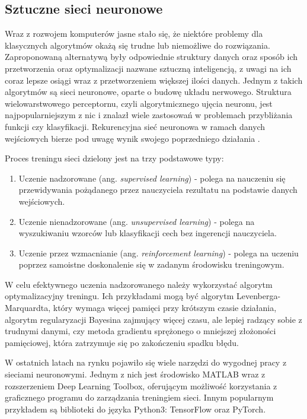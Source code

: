 \documentclass[12pt, a4paper]{article}
\begin{document}
\subsection{Sztuczne sieci neuronowe}
Wraz z rozwojem komputerów jasne stało się, że niektóre problemy dla klasycznych algorytmów okażą się trudne lub niemożliwe do rozwiązania. Zaproponowaną alternatywą były odpowiednie struktury danych oraz sposób ich przetworzenia oraz optymalizacji nazwane sztuczną inteligencją, z uwagi na ich coraz lepsze osiągi wraz z przetworzeniem większej ilości danych. Jednym z takich algorytmów są sieci neuronowe, oparte o budowę układu nerwowego. Struktura wielowarstwowego perceptornu, czyli algorytmicznego ujęcia neuronu, jest najpopularniejszym z nic i znalazł wiele zastosowań w problemach przybliżania funkcji czy klasyfikacji. Rekurencyjna sieć neuronowa w ramach danych wejściowych bierze pod uwagę wynik swojego poprzedniego działania \cite{en.wikipedia.org/wiki/Multilayer_perceptron}.

Proces treningu sieci dzielony jest na trzy podstawowe typy: 

\begin{enumerate}
	\item Uczenie nadzorowane (ang. \textit{supervised learning}) - polega na nauczeniu się przewidywania pożądanego przez nauczyciela rezultatu na podstawie danych wejściowych.
	\item Uczenie nienadzorowane (ang. \textit{unsupervised learning}) - polega na wyszukiwaniu wzorców lub klasyfikacji cech bez ingerencji nauczyciela.
	\item Uczenie przez wzmacnianie (ang. \textit{reinforcement learning}) - polega na uczeniu poprzez samoistne doskonalenie się w zadanym środowisku treningowym.
\end{enumerate}

W celu efektywnego uczenia nadzorowanego należy wykorzystać algorytm optymalizacyjny treningu. Ich przykładami mogą być algorytm Levenberga-Marquardta, który wymaga więcej pamięci przy krótszym czasie działania, algorytm regularyzacji Bayesina zajmujący więcej czasu, ale lepiej radzący sobie z trudnymi danymi, czy metoda gradientu sprężonego o mniejszej złożoności pamięciowej, która zatrzymuje się po zakończeniu spadku błędu. 

W ostatnich latach na rynku pojawiło się wiele narzędzi do wygodnej pracy z sieciami neuronowymi. Jednym z nich jest środowisko MATLAB wraz z rozszerzeniem Deep Learning Toolbox, oferującym możliwość korzystania z graficznego programu do zarządzania treningiem sieci. Innym popularnym przykładem są biblioteki do języka Python3: TensorFlow oraz PyTorch.
\end{document}
